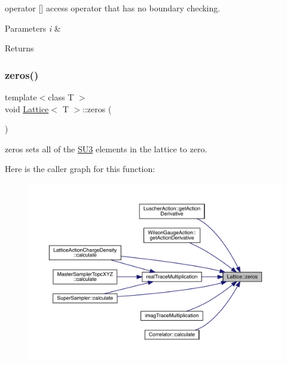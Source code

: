 operator \mbox{[}\mbox{]} access operator that has no boundary checking. 


\begin{DoxyParams}{Parameters}
{\em i} & \\
\hline
\end{DoxyParams}
\begin{DoxyReturn}{Returns}

\end{DoxyReturn}
\mbox{\label{class_lattice_a1e8bfb54f85e78f2c97e8b90d2b47dc9}} 
\subsubsection{\texorpdfstring{zeros()}{zeros()}}
{\footnotesize\ttfamily template$<$class T $>$ \\
void \mbox{\hyperlink{class_lattice}{Lattice}}$<$ T $>$\+::zeros (\begin{DoxyParamCaption}{ }\end{DoxyParamCaption})\hspace{0.3cm}{\ttfamily [inline]}}



zeros sets all of the \mbox{\hyperlink{class_s_u3}{S\+U3}} elements in the lattice to zero. 

Here is the caller graph for this function\+:\nopagebreak
\begin{figure}[H]
\begin{center}
\leavevmode
\includegraphics[width=350pt]{class_lattice_a1e8bfb54f85e78f2c97e8b90d2b47dc9_icgraph}
\end{center}
\end{figure}


